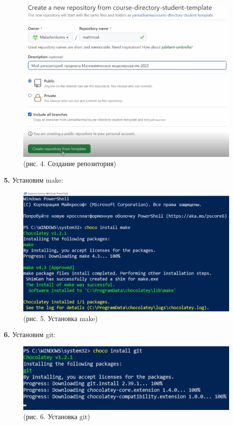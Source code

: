 \documentclass[
  12pt,
  a4paper,
]{scrreprt}
\begin{document}
\begin{figure}
\centering
\includegraphics{./tex2pdf.-cbf55669a78d292a/image/4.PNG}
\caption{(рис. 4. Создание репозитория)}
\end{figure}

\textbf{5.} Установим make:

\begin{figure}
\centering
\includegraphics{./tex2pdf.-cbf55669a78d292a/image/5.PNG}
\caption{(рис. 5. Установка make)}
\end{figure}

\textbf{6.} Установим git:

\begin{figure}
\centering
\includegraphics{./tex2pdf.-cbf55669a78d292a/image/6.PNG}
\caption{(рис. 6. Установка git)}
\end{figure}
\end{document}
